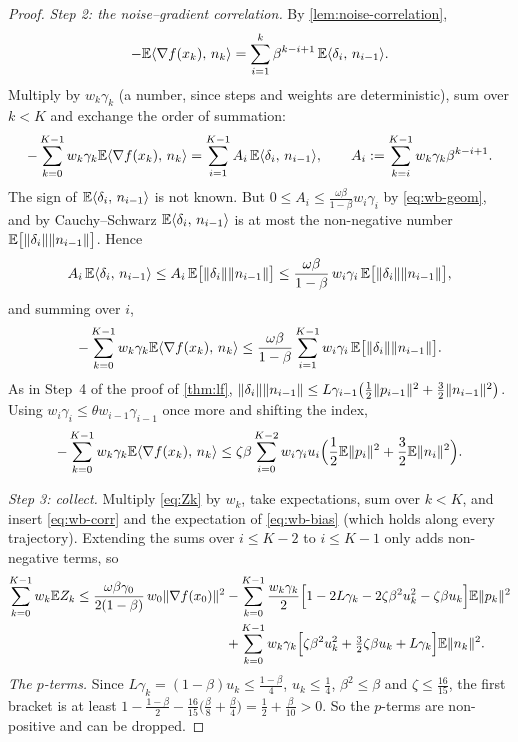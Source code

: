\begin{proof}
\emph{Step 2: the noise--gradient correlation.} By \cref{lem:noise-correlation},
\[
  -\mathbb{E}\langle \nabla f(x_k),\, n_k\rangle=\sum_{i=1}^k\beta^{k-i+1}\,\mathbb{E}\langle \delta_i,\, n_{i-1}\rangle .
\]
Multiply by $w_k\gamma_k$ (a number, since steps and weights are deterministic), sum over
$k<K$ and exchange the order of summation:
\[
  -\sum_{k=0}^{K-1}w_k\gamma_k\mathbb{E}\langle \nabla f(x_k),\, n_k\rangle=\sum_{i=1}^{K-1}A_i\,\mathbb{E}\langle \delta_i,\, n_{i-1}\rangle,
  \qquad A_i:=\sum_{k=i}^{K-1}w_k\gamma_k\beta^{k-i+1}.
\]
The sign of $\mathbb{E}\langle \delta_i,\, n_{i-1}\rangle$ is not known. But $0\le A_i\le\frac{\omega\beta}{1-\beta}w_i\gamma_i$
by \eqref{eq:wb-geom}, and by Cauchy--Schwarz $\mathbb{E}\langle \delta_i,\, n_{i-1}\rangle$ is at most the
non-negative number $\mathbb{E}\bigl[\lVert \delta_i\rVert\lVert n_{i-1}\rVert\bigr]$. Hence
\[
  A_i\,\mathbb{E}\langle \delta_i,\, n_{i-1}\rangle\le A_i\,\mathbb{E}\bigl[\lVert \delta_i\rVert\lVert n_{i-1}\rVert\bigr]
  \le\frac{\omega\beta}{1-\beta}\,w_i\gamma_i\,\mathbb{E}\bigl[\lVert \delta_i\rVert\lVert n_{i-1}\rVert\bigr],
\]
and summing over $i$,
\[
  -\sum_{k=0}^{K-1}w_k\gamma_k\mathbb{E}\langle \nabla f(x_k),\, n_k\rangle
  \le\frac{\omega\beta}{1-\beta}\sum_{i=1}^{K-1}w_i\gamma_i\,\mathbb{E}\bigl[\lVert \delta_i\rVert\lVert n_{i-1}\rVert\bigr].
\]
As in Step~4 of the proof of \cref{thm:lf},
$\lVert \delta_i\rVert\lVert n_{i-1}\rVert\le L\gamma_{i-1}\bigl(\frac12\lVert p_{i-1}\rVert^2+\frac32\lVert n_{i-1}\rVert^2\bigr)$.
Using $w_i\gamma_i\le\theta w_{i-1}\gamma_{i-1}$ once more and shifting the index,
\begin{equation}\label{eq:wb-corr}
  -\sum_{k=0}^{K-1}w_k\gamma_k\mathbb{E}\langle \nabla f(x_k),\, n_k\rangle
  \le\zeta\beta\sum_{i=0}^{K-2}w_i\gamma_iu_i\Bigl(\frac12\mathbb{E}\lVert p_i\rVert^2+\frac32\mathbb{E}\lVert n_i\rVert^2\Bigr).
\end{equation}

\emph{Step 3: collect.} Multiply \eqref{eq:Zk} by $w_k$, take expectations, sum over
$k<K$, and insert \eqref{eq:wb-corr} and the expectation of \eqref{eq:wb-bias} (which holds
along every trajectory). Extending the sums over
$i\le K-2$ to $i\le K-1$ only adds non-negative terms, so
\begin{align*}
  \sum_{k=0}^{K-1}w_k\mathbb{E} Z_k
  \le\frac{\omega\beta\gamma_0}{2(1-\beta)}\,w_0\lVert \nabla f(x_0)\rVert^2
  &-\sum_{k=0}^{K-1}\frac{w_k\gamma_k}{2}\Bigl[1-2L\gamma_k-2\zeta\beta^2u_k^2-\zeta\beta u_k\Bigr]\mathbb{E}\lVert p_k\rVert^2\\
  &+\sum_{k=0}^{K-1}w_k\gamma_k\Bigl[\zeta\beta^2u_k^2+\tfrac32\zeta\beta u_k+L\gamma_k\Bigr]\mathbb{E}\lVert n_k\rVert^2 .
\end{align*}
\emph{The $p$-terms.} Since $L\gamma_k=(1-\beta)u_k\le\frac{1-\beta}{4}$, $u_k\le\frac14$,
$\beta^2\le\beta$ and $\zeta\le\frac{16}{15}$, the first bracket is at least
$1-\frac{1-\beta}{2}-\frac{16}{15}\bigl(\frac\beta8+\frac\beta4\bigr)=\frac12+\frac{\beta}{10}>0$.
So the $p$-terms are non-positive and can be dropped.


\end{proof}
